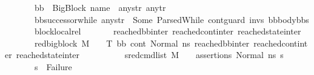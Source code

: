 \begin{isabellebody}
\ \ \ \ \ \ \ {\isachardoublequoteopen}bb\ {\isacharequal}{\kern0pt}\ {\isacharparenleft}{\kern0pt}BigBlock\ name\ {\isacharbrackleft}{\kern0pt}{\isacharbrackright}{\kern0pt}\ any{\isacharunderscore}{\kern0pt}str\ any{\isacharunderscore}{\kern0pt}tr{\isacharparenright}{\kern0pt}{\isachardoublequoteclose}\isanewline
\ \ \ \ \ \ \ bb{\isacharunderscore}{\kern0pt}successor{\isacharunderscore}{\kern0pt}while{\isacharcolon}{\kern0pt}\ {\isachardoublequoteopen}any{\isacharunderscore}{\kern0pt}str\ {\isacharequal}{\kern0pt}\ Some\ {\isacharparenleft}{\kern0pt}ParsedWhile\ cont{\isacharunderscore}{\kern0pt}guard\ invs\ {\isacharparenleft}{\kern0pt}bb{}{\isacharhash}{\kern0pt}body{\isacharunderscore}{\kern0pt}bbs{\isacharparenright}{\kern0pt}{\isacharparenright}{\kern0pt}{\isachardoublequoteclose}\isanewline
\ \ \ \ \ \ \ block{\isacharunderscore}{\kern0pt}local{\isacharunderscore}{\kern0pt}rel{\isacharcolon}{\kern0pt}\isanewline
\ \ \ \ \ \ {\isachardoublequoteopen}{\isasymAnd}\ reached{\isacharunderscore}{\kern0pt}bb{\isacharunderscore}{\kern0pt}inter\ reached{\isacharunderscore}{\kern0pt}cont{\isacharunderscore}{\kern0pt}inter\ reached{\isacharunderscore}{\kern0pt}state{\isacharunderscore}{\kern0pt}inter{\isachardot}{\kern0pt}\isanewline
\ \ \ \ \ \ \ {\isacharparenleft}{\kern0pt}red{\isacharunderscore}{\kern0pt}bigblock\ M\ {\isasymLambda}\ {\isasymGamma}\ {\isasymOmega}\ T\ {\isacharparenleft}{\kern0pt}bb{\isacharcomma}{\kern0pt}\ cont{}{\isacharcomma}{\kern0pt}\ {\isacharparenleft}{\kern0pt}Normal\ ns{}{\isacharparenright}{\kern0pt}{\isacharparenright}{\kern0pt}\ {\isacharparenleft}{\kern0pt}reached{\isacharunderscore}{\kern0pt}bb{\isacharunderscore}{\kern0pt}inter{\isacharcomma}{\kern0pt}\ reached{\isacharunderscore}{\kern0pt}cont{\isacharunderscore}{\kern0pt}inter{\isacharcomma}{\kern0pt}\ reached{\isacharunderscore}{\kern0pt}state{\isacharunderscore}{\kern0pt}inter{\isacharparenright}{\kern0pt}{\isacharparenright}{\kern0pt}\ {\isasymLongrightarrow}\ \isanewline
\ \ \ \ \ \ \ {\isacharparenleft}{\kern0pt}{\isasymAnd}\ s{}{\isacharprime}{\kern0pt}{\isachardot}{\kern0pt}{\isacharparenleft}{\kern0pt}{\isacharparenleft}{\kern0pt}red{\isacharunderscore}{\kern0pt}cmd{\isacharunderscore}{\kern0pt}list\ M\ {\isasymLambda}\ {\isasymGamma}\ {\isasymOmega}\ assertions\ {\isacharparenleft}{\kern0pt}Normal\ ns{}{\isacharparenright}{\kern0pt}\ s{}{\isacharprime}{\kern0pt}{\isacharparenright}{\kern0pt}\ {\isasymLongrightarrow}\ \isanewline
\ \ \ \ \ \ \ {\isacharparenleft}{\kern0pt}s{}{\isacharprime}{\kern0pt}\ {\isasymnoteq}\ Failure{\isacharparenright}{\kern0pt}{\isacharparenright}{\kern0pt}{\isacharparenright}{\kern0pt}\ {\isasymLongrightarrow}\ \ \ \isanewline

\end{isabellebody}
